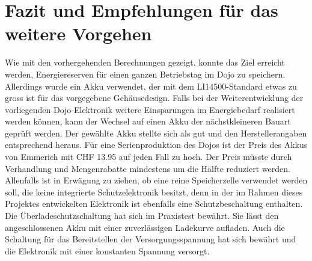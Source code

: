 
\section{Fazit und Empfehlungen für das weitere Vorgehen}

Wie mit den vorhergehenden Berechnungen gezeigt, konnte das Ziel erreicht werden, Energiereserven für einen ganzen Betriebstag im Dojo zu speichern. Allerdings wurde ein Akku verwendet, der mit dem LI14500-Standard etwas zu gross ist für das vorgegebene Gehäusedesign. Falls bei der Weiterentwicklung der vorliegenden Dojo-Elektronik weitere Einsparungen im Energiebedarf realisiert werden können, kann der Wechsel auf einen Akku der nächstkleineren Bauart geprüft werden. Der gewählte Akku stellte sich als gut und den Herstellerangaben entsprechend heraus. Für eine Serienproduktion des Dojos ist der Preis des Akkus von Emmerich mit CHF 13.95 auf jeden Fall zu hoch. Der Preis müsste durch Verhandlung und Mengenrabatte mindestens um die Hälfte reduziert werden. Allenfalls ist in Erwägung zu ziehen, ob eine reine Speicherzelle verwendet werden soll, die keine integrierte Schutzelektronik besitzt, denn in der im Rahmen dieses Projektes entwickelten Elektronik ist ebenfalls eine Schutzbeschaltung enthalten. Die Überladeschutzschaltung hat sich im Praxistest bewährt. Sie lässt den angeschlossenen Akku mit einer zuverlässigen Ladekurve aufladen. Auch die Schaltung für das Bereitstellen der Versorgungsspannung hat sich bewährt und die Elektronik mit einer konstanten Spannung versorgt. 
